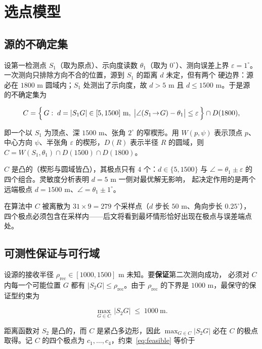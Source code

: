 \section{选点模型}\label{sec:model}

\subsection{源的不确定集}

设第一检测点 $S_1$（取为原点）、示向度读数 $\theta_1$（取为 $0^\circ$）、测向误差上界
$\varepsilon=1^\circ$。一次测向只排除方向不合的位置，源到 $S_1$ 的距离 $d$ 未定，但有两个
硬边界：源必在 $1800$ m 圆域内；$S_1$ 处测出了示向度，故 $d>5$ m 且 $d\le1500$ m。于是源
的不确定集为

\begin{equation}
  C=\Bigl\{\,G:\;d=|S_1G|\in[5,1500]\ \text{m},\;
  \bigl|\angle(S_1\!\to\! G)-\theta_1\bigr|\le\varepsilon\,\Bigr\}\cap D(1800),
  \label{eq:C}
\end{equation}

即一个以 $S_1$ 为顶点、深 $1500$ m、张角 $2^\circ$ 的窄楔形。用 $W(p,\psi)$ 表示顶点 $p$、
中心方向 $\psi$、半张角 $\varepsilon$ 的楔形，$D(R)$ 表示半径 $R$ 的圆域，则
$C=W(S_1,\theta_1)\cap D(1500)\cap D(1800)$。

$C$ 是凸的（楔形与圆域皆凸），其极点只有 $4$ 个：$d\in\{5,1500\}$ 与
$\angle=\theta_1\pm\varepsilon$ 的四个组合。灵敏度分析表明 $d=5$ m 一侧对最优解无影响，
起决定作用的是两个远端极点 $d=1500$ m、$\angle=\theta_1\pm1^\circ$。

在算法中 $C$ 被离散为 $31\times9=279$ 个采样点（$d$ 步长 $50$ m、角向步长 $0.25^\circ$），
四个极点必须包含在采样内——后文将看到最坏情形恰好出现在极点与误差端点处。

\subsection{可测性保证与可行域}

设源的接收半径 $\rho_{\mathrm{rec}}\in[1000,1500]$ m 未知。要\textbf{保证}第二次测向成功，
必须对 $C$ 内每一个可能位置 $G$ 都有 $|S_2G|\le\rho_{\mathrm{rec}}$。由于
$\rho_{\mathrm{rec}}$ 的下界是 $1000$ m，最保守的保证型约束为

\begin{equation}
  \max_{G\in C}\,|S_2G|\;\le\;1000\ \text{m}.
  \label{eq:feasible}
\end{equation}

距离函数对 $S_2$ 是凸的，而 $C$ 是紧凸多边形，因此 $\max_{G\in C}|S_2G|$ 必在 $C$ 的极点
取得。记 $C$ 的四个极点为 $c_1,\dots,c_4$，约束~\eqref{eq:feasible} 等价于

